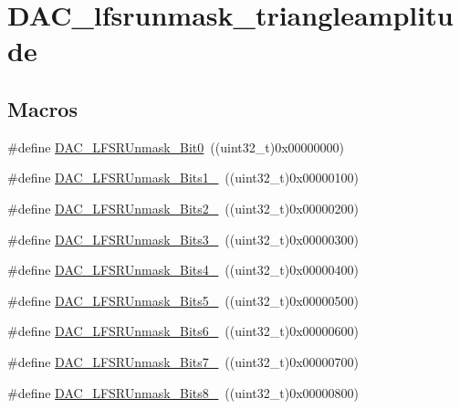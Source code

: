 \hypertarget{group___d_a_c__lfsrunmask__triangleamplitude}{}\section{D\+A\+C\+\_\+lfsrunmask\+\_\+triangleamplitude}
\label{group___d_a_c__lfsrunmask__triangleamplitude}
\subsection*{Macros}
\begin{DoxyCompactItemize}
\item 
\#define \hyperlink{group___d_a_c__lfsrunmask__triangleamplitude_ga60794fd5092a332cfa82e1cee13945fc}{D\+A\+C\+\_\+\+L\+F\+S\+R\+Unmask\+\_\+\+Bit0}~((uint32\+\_\+t)0x00000000)
\item 
\#define \hyperlink{group___d_a_c__lfsrunmask__triangleamplitude_ga09f47cfa563252a1add4662284350c07}{D\+A\+C\+\_\+\+L\+F\+S\+R\+Unmask\+\_\+\+Bits1\+\_}~((uint32\+\_\+t)0x00000100)
\item 
\#define \hyperlink{group___d_a_c__lfsrunmask__triangleamplitude_ga60b800857b7e33d9c0be2846fc56849f}{D\+A\+C\+\_\+\+L\+F\+S\+R\+Unmask\+\_\+\+Bits2\+\_}~((uint32\+\_\+t)0x00000200)
\item 
\#define \hyperlink{group___d_a_c__lfsrunmask__triangleamplitude_gafe219362b3a48d8678a65ef38cb45532}{D\+A\+C\+\_\+\+L\+F\+S\+R\+Unmask\+\_\+\+Bits3\+\_}~((uint32\+\_\+t)0x00000300)
\item 
\#define \hyperlink{group___d_a_c__lfsrunmask__triangleamplitude_ga2543d802e19d592a26c8231be663cdac}{D\+A\+C\+\_\+\+L\+F\+S\+R\+Unmask\+\_\+\+Bits4\+\_}~((uint32\+\_\+t)0x00000400)
\item 
\#define \hyperlink{group___d_a_c__lfsrunmask__triangleamplitude_ga71a01660d410823bfe76a603080dc125}{D\+A\+C\+\_\+\+L\+F\+S\+R\+Unmask\+\_\+\+Bits5\+\_}~((uint32\+\_\+t)0x00000500)
\item 
\#define \hyperlink{group___d_a_c__lfsrunmask__triangleamplitude_ga48fe2d3f4274d6bf28e446ca0001ed5d}{D\+A\+C\+\_\+\+L\+F\+S\+R\+Unmask\+\_\+\+Bits6\+\_}~((uint32\+\_\+t)0x00000600)
\item 
\#define \hyperlink{group___d_a_c__lfsrunmask__triangleamplitude_gaf0a93c1ee1e13776fae7558b36243431}{D\+A\+C\+\_\+\+L\+F\+S\+R\+Unmask\+\_\+\+Bits7\+\_}~((uint32\+\_\+t)0x00000700)
\item 
\#define \hyperlink{group___d_a_c__lfsrunmask__triangleamplitude_ga4f56965841d9d91ca5b6de43ee589598}{D\+A\+C\+\_\+\+L\+F\+S\+R\+Unmask\+\_\+\+Bits8\+\_}~((uint32\+\_\+t)0x00000800)

\end{DoxyCompactItemize}

